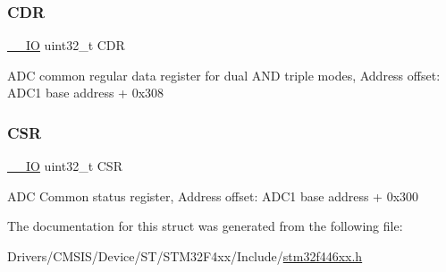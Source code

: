 \subsubsection{\texorpdfstring{C\+DR}{CDR}}
{\footnotesize\ttfamily \mbox{\hyperlink{core__sc300_8h_aec43007d9998a0a0e01faede4133d6be}{\+\_\+\+\_\+\+IO}} uint32\+\_\+t C\+DR}

A\+DC common regular data register for dual A\+ND triple modes, Address offset\+: A\+D\+C1 base address + 0x308 \mbox{\label{struct_a_d_c___common___type_def_a876dd0a8546697065f406b7543e27af2}} 
\subsubsection{\texorpdfstring{C\+SR}{CSR}}
{\footnotesize\ttfamily \mbox{\hyperlink{core__sc300_8h_aec43007d9998a0a0e01faede4133d6be}{\+\_\+\+\_\+\+IO}} uint32\+\_\+t C\+SR}

A\+DC Common status register, Address offset\+: A\+D\+C1 base address + 0x300 

The documentation for this struct was generated from the following file\+:\begin{DoxyCompactItemize}
\item 
Drivers/\+C\+M\+S\+I\+S/\+Device/\+S\+T/\+S\+T\+M32\+F4xx/\+Include/\mbox{\hyperlink{stm32f446xx_8h}{stm32f446xx.\+h}}\end{DoxyCompactItemize}
